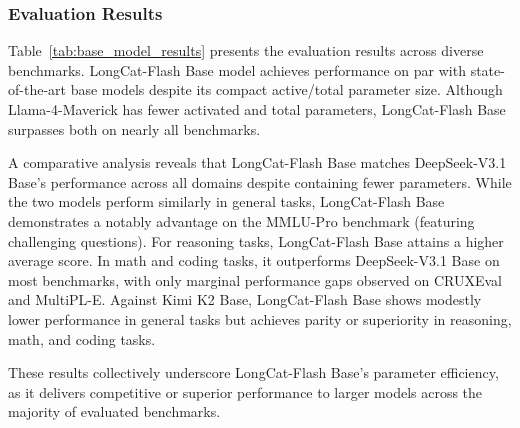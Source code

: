 \documentclass{article}
\newcommand{\longcat}{LongCat-Flash\xspace}
\begin{document}
\subsubsection{Evaluation Results}

Table~\ref{tab:base_model_results} presents the evaluation results across diverse benchmarks. \longcat Base model achieves performance on par with state-of-the-art base models despite its compact active/total parameter size. Although Llama-4-Maverick has fewer activated and total parameters, \longcat Base surpasses both on nearly all benchmarks.

A comparative analysis reveals that \longcat Base matches DeepSeek-V3.1 Base's performance across all domains despite containing fewer parameters. While the two models perform similarly in general tasks, \longcat Base demonstrates a notably advantage on the MMLU-Pro benchmark (featuring challenging questions). For reasoning tasks, \longcat Base attains a higher average score. In math and coding tasks, it outperforms DeepSeek-V3.1 Base on most benchmarks, with only marginal performance gaps observed on CRUXEval and MultiPL-E. Against Kimi K2 Base, \longcat Base shows modestly lower performance in general tasks but achieves parity or superiority in reasoning, math, and coding tasks. 

These results collectively underscore \longcat Base's parameter efficiency, as it delivers competitive or superior performance to larger models across the majority of evaluated benchmarks.
\end{document}
